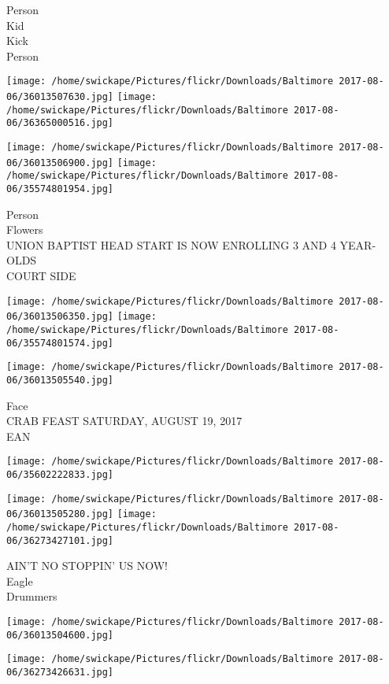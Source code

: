 \documentclass[10pt,letterpaper]{article}
\begin{document}
Person\\
Kid\\
Kick\\
Person\\
\pagebreak

\texttt{[image: /home/swickape/Pictures/flickr/Downloads/Baltimore 2017-08-06/36013507630.jpg]}
\texttt{[image: /home/swickape/Pictures/flickr/Downloads/Baltimore 2017-08-06/36365000516.jpg]}

\texttt{[image: /home/swickape/Pictures/flickr/Downloads/Baltimore 2017-08-06/36013506900.jpg]}
\texttt{[image: /home/swickape/Pictures/flickr/Downloads/Baltimore 2017-08-06/35574801954.jpg]}

Person\\
Flowers\\
UNION BAPTIST HEAD START IS NOW ENROLLING 3 AND 4 YEAR{-}OLDS\\
COURT SIDE\\
\pagebreak

\texttt{[image: /home/swickape/Pictures/flickr/Downloads/Baltimore 2017-08-06/36013506350.jpg]}
\texttt{[image: /home/swickape/Pictures/flickr/Downloads/Baltimore 2017-08-06/35574801574.jpg]}

\texttt{[image: /home/swickape/Pictures/flickr/Downloads/Baltimore 2017-08-06/36013505540.jpg]}

Face\\
CRAB FEAST SATURDAY, AUGUST 19, 2017\\
EAN\\
\pagebreak

\texttt{[image: /home/swickape/Pictures/flickr/Downloads/Baltimore 2017-08-06/35602222833.jpg]}

\vspace{0.25in}
\texttt{[image: /home/swickape/Pictures/flickr/Downloads/Baltimore 2017-08-06/36013505280.jpg]}
\texttt{[image: /home/swickape/Pictures/flickr/Downloads/Baltimore 2017-08-06/36273427101.jpg]}

AIN'T NO STOPPIN' US NOW!\\
Eagle\\
Drummers\\
\pagebreak

\texttt{[image: /home/swickape/Pictures/flickr/Downloads/Baltimore 2017-08-06/36013504600.jpg]}

\vspace{0.25in}
\texttt{[image: /home/swickape/Pictures/flickr/Downloads/Baltimore 2017-08-06/36273426631.jpg]}
\end{document}
